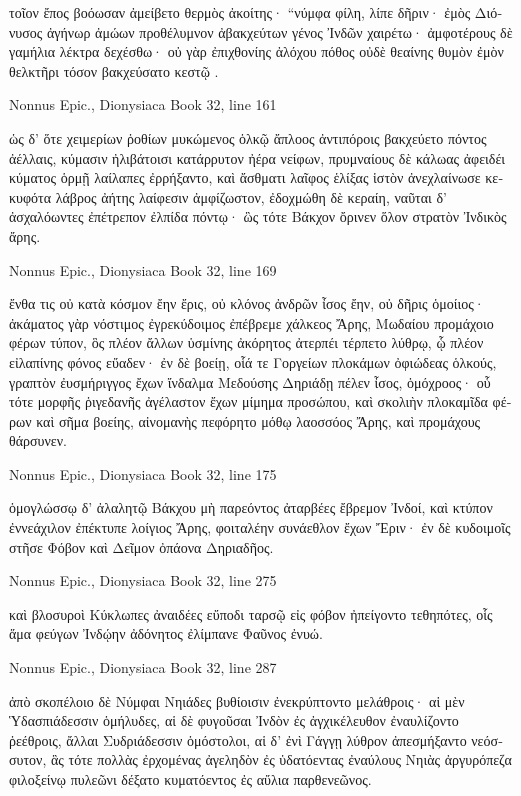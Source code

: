 \documentclass[12pt,letterpaper,twoside,final]{memoir}
\begin{document}
\begin{greek}
τοῖον ἔπος βοόωσαν ἀμείβετο θερμὸς ἀκοίτης·   
 “νύμφα φίλη, λίπε δῆριν· ἐμὸς Διόνυσος ἀγήνωρ 
ἀμώων προθέλυμνον ἀβακχεύτων γένος Ἰνδῶν 
χαιρέτω· ἀμφοτέρους δὲ γαμήλια λέκτρα δεχέσθω· 
οὐ γὰρ ἐπιχθονίης ἀλόχου πόθος οὐδὲ θεαίνης 
θυμὸν ἐμὸν θελκτῆρι τόσον βακχεύσατο κεστῷ . 



Nonnus Epic., Dionysiaca 
Book 32, line 161

ὡς δ' ὅτε χειμερίων ῥοθίων μυκώμενος ὁλκῷ 
ἄπλοος ἀντιπόροις βακχεύετο πόντος ἀέλλαις, 
κύμασιν ἠλιβάτοισι κατάρρυτον ἠέρα νείφων, 
πρυμναίους δὲ κάλωας ἀφειδέι κύματος ὁρμῇ 
λαίλαπες ἐρρήξαντο, καὶ ἄσθματι λαῖφος ἑλίξας 
ἱστὸν ἀνεχλαίνωσε κεκυφότα λάβρος ἀήτης 
λαίφεσιν ἀμφίζωστον, ἐδοχμώθη δὲ κεραίη, 
ναῦται δ' ἀσχαλόωντες ἐπέτρεπον ἐλπίδα πόντῳ· 
ὣς τότε Βάκχον ὄρινεν ὅλον στρατὸν Ἰνδικὸς ἄρης. 



Nonnus Epic., Dionysiaca 
Book 32, line 169

ἔνθα τις οὐ κατὰ κόσμον ἔην ἔρις, οὐ κλόνος ἀνδρῶν 
ἶσος ἔην, οὐ δῆρις ὁμοίιος· ἀκάματος γὰρ 
νόστιμος ἐγρεκύδοιμος ἐπέβρεμε χάλκεος Ἄρης, 
Μωδαίου προμάχοιο φέρων τύπον, ὃς πλέον ἄλλων 
ὑσμίνης ἀκόρητος ἀτερπέι τέρπετο λύθρῳ,   
ᾧ πλέον εἰλαπίνης φόνος εὔαδεν· ἐν δὲ βοείῃ, 
οἷά τε Γοργείων πλοκάμων ὀφιώδεας ὁλκούς, 
γραπτὸν ἐυσμήριγγος ἔχων ἴνδαλμα Μεδούσης 
Δηριάδῃ πέλεν ἶσος, ὁμόχροος· οὗ τότε μορφῆς 
ῥιγεδανῆς ἀγέλαστον ἔχων μίμημα προσώπου, 
καὶ σκολιὴν πλοκαμῖδα φέρων καὶ σῆμα βοείης, 
αἰνομανὴς πεφόρητο μόθῳ λαοσσόος Ἄρης, 
καὶ προμάχους θάρσυνεν. 



Nonnus Epic., Dionysiaca 
Book 32, line 175

                           ὁμογλώσσῳ δ' ἀλαλητῷ 
Βάκχου μὴ παρεόντος ἀταρβέες ἔβρεμον Ἰνδοί, 
καὶ κτύπον ἐννεάχιλον ἐπέκτυπε λοίγιος Ἄρης, 
φοιταλέην συνάεθλον ἔχων Ἔριν· ἐν δὲ κυδοιμοῖς 
στῆσε Φόβον καὶ Δεῖμον ὀπάονα Δηριαδῆος. 



Nonnus Epic., Dionysiaca 
Book 32, line 275

καὶ βλοσυροὶ Κύκλωπες ἀναιδέες εὔποδι ταρσῷ 
εἰς φόβον ἠπείγοντο τεθηπότες, οἷς ἅμα φεύγων 
Ἰνδῴην ἀδόνητος ἐλίμπανε Φαῦνος ἐνυώ. 



Nonnus Epic., Dionysiaca 
Book 32, line 287

                             ἀπὸ σκοπέλοιο δὲ Νύμφαι 
Νηιάδες βυθίοισιν ἐνεκρύπτοντο μελάθροις· 
αἱ μὲν Ὑδασπιάδεσσιν ὁμήλυδες, αἱ δὲ φυγοῦσαι 
Ἰνδὸν ἐς ἀγχικέλευθον ἐναυλίζοντο ῥεέθροις, 
ἄλλαι Συδριάδεσσιν ὁμόστολοι, αἱ δ' ἐνὶ Γάγγῃ 
λύθρον ἀπεσμήξαντο νεόσσυτον, ἃς τότε πολλὰς 
ἐρχομένας ἀγεληδὸν ἐς ὑδατόεντας ἐναύλους 
Νηιὰς ἀργυρόπεζα φιλοξείνῳ πυλεῶνι 
δέξατο κυματόεντος ἐς αὔλια παρθενεῶνος. 




\end{greek}
\end{document}
